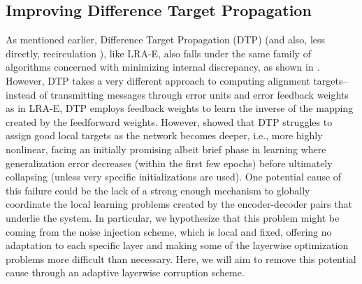 \documentclass[letterpaper]{article} %
\begin{document}


\subsection{Improving Difference Target Propagation}
\label{sec:dtp_sigma}
As mentioned earlier, Difference Target Propagation (DTP) (and also, less directly, recirculation \cite{hinton1988learning,o1996biologically}), like LRA-E, also falls under the same family of algorithms concerned with minimizing internal discrepancy, as shown in \cite{ororbia2017learning,ororbia2018conducting}. However, DTP takes a very different approach to computing alignment targets--instead of transmitting messages through error units and error feedback weights as in LRA-E, DTP employs feedback weights to learn the inverse of the mapping created by the feedforward weights.
However, \cite{ororbia2018conducting} showed that DTP struggles to assign good local targets as the network becomes deeper, i.e., more highly nonlinear, facing an initially promising albeit brief phase in learning where generalization error decreases (within the first few epochs) before ultimately collapsing (unless very specific initializations are used). One potential cause of this failure could be the lack of a strong enough mechanism to globally coordinate the local learning problems created by the encoder-decoder pairs that underlie the system. In particular, we hypothesize that this problem might be coming from the noise injection scheme, which is local and fixed, offering no adaptation to each specific layer and making some of the layerwise optimization problems more difficult than necessary. Here, we will aim to remove this potential cause through an adaptive layerwise corruption scheme.
\end{document}
